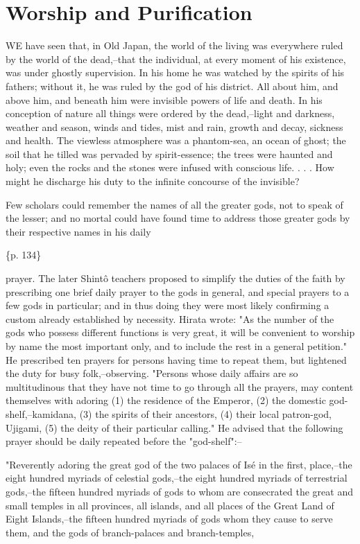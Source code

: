 \section{Worship and Purification}
\label{sec:org09b9fda}

WE have seen that, in Old Japan, the world of the living was everywhere ruled by the world of the dead,--that the individual, at every moment of his existence, was under ghostly supervision. In his home he was watched by the spirits of his fathers; without it, he was ruled by the god of his district. All about him, and above him, and beneath him were invisible powers of life and death. In his conception of nature all things were ordered by the dead,--light and darkness, weather and season, winds and tides, mist and rain, growth and decay, sickness and health. The viewless atmosphere was a phantom-sea, an ocean of ghost; the soil that he tilled was pervaded by spirit-essence; the trees were haunted and holy; even the rocks and the stones were infused with conscious life. . . . How might he discharge his duty to the infinite concourse of the invisible?



Few scholars could remember the names of all the greater gods, not to speak of the lesser; and no mortal could have found time to address those greater gods by their respective names in his daily

\{p. 134\}

prayer. The later Shintô teachers proposed to simplify the duties of the faith by prescribing one brief daily prayer to the gods in general, and special prayers to a few gods in particular; and in thus doing they were most likely confirming a custom already established by necessity. Hirata wrote: "As the number of the gods who possess different functions is very great, it will be convenient to worship by name the most important only, and to include the rest in a general petition." He prescribed ten prayers for persons having time to repeat them, but lightened the duty for busy folk,--observing. "Persons whose daily affairs are so multitudinous that they have not time to go through all the prayers, may content themselves with adoring (1) the residence of the Emperor, (2) the domestic god-shelf,--kamidana, (3) the spirits of their ancestors, (4) their local patron-god, Ujigami, (5) the deity of their particular calling." He advised that the following prayer should be daily repeated before the "god-shelf":--

"Reverently adoring the great god of the two palaces of Isé in the first, place,--the eight hundred myriads of celestial gods,--the eight hundred myriads of terrestrial gods,--the fifteen hundred myriads of gods to whom are consecrated the great and small temples in all provinces, all islands, and all places of the Great Land of Eight Islands,--the fifteen hundred myriads of gods whom they cause to serve them, and the gods of branch-palaces and branch-temples,

